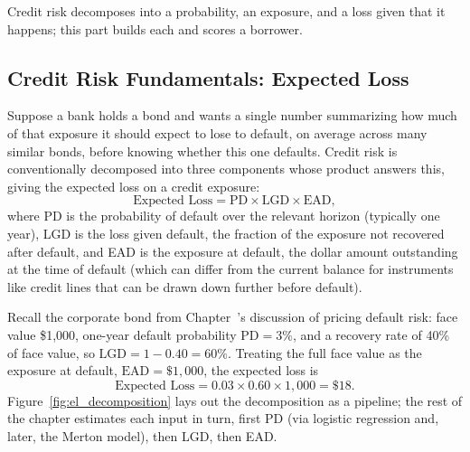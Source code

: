 \documentclass[../ai_in_finance]{subfiles}
\begin{document}
Credit risk decomposes into a probability, an exposure, and a loss given that it happens; this part builds each and scores a borrower.

\subsection{Credit Risk Fundamentals: Expected Loss}
\label{sec:credit-risk-fundamentals}

Suppose a bank holds a bond and wants a single number summarizing how much of that exposure it should expect to lose to default, on average across many similar bonds, before knowing whether this one defaults. Credit risk is conventionally decomposed into three components whose product answers this, giving the expected loss on a credit exposure:
\begin{equation}
\label{eq:creditrisk-expected-loss}
\text{Expected Loss} = \text{PD} \times \text{LGD} \times \text{EAD},
\end{equation}
where PD is the probability of default over the relevant horizon (typically one year), LGD is the loss given default, the fraction of the exposure not recovered after default, and EAD is the exposure at default, the dollar amount outstanding at the time of default (which can differ from the current balance for instruments like credit lines that can be drawn down further before default).

Recall the corporate bond from Chapter~'s discussion of pricing default risk: face value \$1,000, one-year default probability $\text{PD}=3\%$, and a recovery rate of 40\% of face value, so $\text{LGD} = 1 - 0.40 = 60\%$. Treating the full face value as the exposure at default, $\text{EAD}=\$1{,}000$, the expected loss is
\begin{equation*}
\text{Expected Loss} = 0.03 \times 0.60 \times 1{,}000 = \$18.
\end{equation*}
Figure~\ref{fig:el_decomposition} lays out the decomposition as a pipeline; the rest of the chapter estimates each input in turn, first PD (via logistic regression and, later, the Merton model), then LGD, then EAD.
\end{document}
